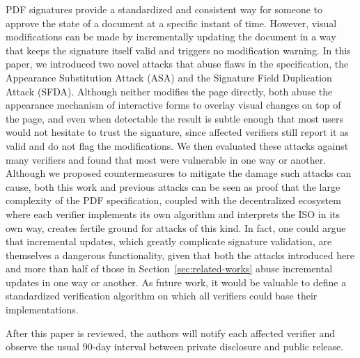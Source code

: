 \documentclass[12pt]{article}
\begin{document}
PDF signatures provide a standardized and consistent way for someone to approve the state of a document at a specific instant of time. However, visual modifications can be made by incrementally updating the document in a way that keeps the signature itself valid and triggers no modification warning. In this paper, we introduced two novel attacks that abuse flaws in the specification, the Appearance Substitution Attack (ASA) and the Signature Field Duplication Attack (SFDA). Although neither modifies the page directly, both abuse the appearance mechanism of interactive forms to overlay visual changes on top of the page, and even when detectable the result is subtle enough that most users would not hesitate to trust the signature, since affected verifiers still report it as valid and do not flag the modifications. We then evaluated these attacks against many verifiers and found that most were vulnerable in one way or another. Although we proposed countermeasures to mitigate the damage such attacks can cause, both this work and previous attacks can be seen as proof that the large complexity of the PDF specification, coupled with the decentralized ecosystem where each verifier implements its own algorithm and interprets the ISO in its own way, creates fertile ground for attacks of this kind. In fact, one could argue that incremental updates, which greatly complicate signature validation, are themselves a dangerous functionality, given that both the attacks introduced here and more than half of those in Section~\ref{sec:related-works} abuse incremental updates in one way or another. As future work, it would be valuable to define a standardized verification algorithm on which all verifiers could base their implementations.

After this paper is reviewed, the authors will notify each affected verifier and observe the usual 90-day interval between private disclosure and public release.




\end{document}
